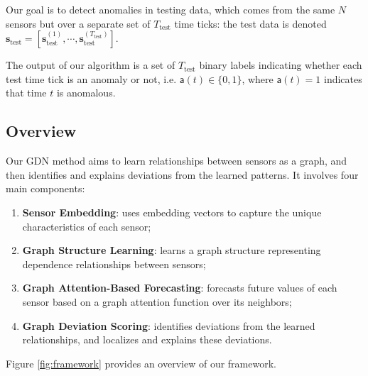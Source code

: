 \documentclass[letterpaper]{article} %
\newcommand{\Tte}{T_\text{test}}
\begin{document}
Our goal is to detect anomalies in testing data, which comes from the same $N$ sensors but over a separate set of $\Tte$ time ticks: the test data is denoted $\mathbf{s}_\text{test} = \left[\mathbf{s}^{(1)}_\text{test},\cdots,\mathbf{s}^{(\Tte)}_\text{test}\right]$. 

The output of our algorithm is a set of $\Tte$ binary labels indicating whether each test time tick is an anomaly or not, i.e. $\mathsf{a}(t) \in \{0, 1\}$, where $\mathsf{a}(t) = 1$ indicates that time $t$ is anomalous. 

\subsection{Overview}
Our \textsc{GDN} method aims to learn relationships between sensors as a graph, and then identifies and explains deviations from the learned patterns. It involves four main components: 
\begin{enumerate}
    \item \textbf{Sensor Embedding}: uses embedding vectors to capture the unique characteristics of each sensor;
    \item \textbf{Graph Structure Learning}: learns a graph structure representing dependence relationships between sensors;
    \item \textbf{Graph Attention-Based Forecasting}: forecasts future values of each sensor based on a graph attention function over its neighbors;
    \item \textbf{Graph Deviation Scoring}: identifies deviations from the learned relationships, and localizes and explains these deviations.
\end{enumerate}
Figure \ref{fig:framework} provides an overview of our framework.


\end{document}
